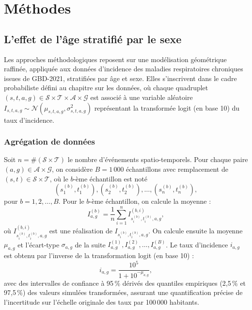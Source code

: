 \chapter{Méthodes}
\label{chap:methods}

\section{L'effet de l'âge stratifié par le sexe}

Les approches méthodologiques reposent sur une modélisation géométrique raffinée, appliquée aux données d'incidence des maladies respiratoires chroniques issues de GBD-2021, stratifiées par âge et sexe. Elles s'inscrivent dans le cadre probabiliste défini au chapitre sur les données, où chaque quadruplet $(s,t,a,g) \in \mathcal{S} \times \mathcal{T} \times \mathcal{A} \times \mathcal{G}$ est associé à une variable aléatoire $I_{s,t,a,g} \sim \mathcal{N}(\mu_{s,t,a,g}, \sigma_{s,t,a,g}^2)$ représentant la transformée logit (en base 10) du taux d'incidence.

\subsection{Agrégation de données}

Soit $n = \# (\mathcal{S} \times \mathcal{T})$ le nombre d'événements spatio-temporels. Pour chaque paire $(a,g) \in \mathcal{A} \times \mathcal{G}$, on considère $B = 1\,000$ échantillons avec remplacement de $(s,t) \in \mathcal{S} \times \mathcal{T}$, où le $b$-ème échantillon est noté
\begin{equation}
(s_1^{(b)}, t_1^{(b)}), (s_2^{(b)}, t_2^{(b)}), \dots, (s_n^{(b)}, t_n^{(b)}),
\end{equation}
pour $b = 1, 2, \dots, B$. Pour le $b$-ème échantillon, on calcule la moyenne :
\begin{equation}
I_{a,g}^{(b)} = \frac{1}{n} \sum_{i=1}^n I_{s_i^{(b)}, t_i^{(b)}, a, g}^{(b,i)},
\end{equation}
où $I_{s_i^{(b)}, t_i^{(b)}, a, g}^{(b,i)}$ est une réalisation de $I_{s_i^{(b)}, t_i^{(b)}, a, g}$. On calcule ensuite la moyenne $\mu_{a,g}$ et l'écart-type $\sigma_{a,g}$ de la suite $I_{a,g}^{(1)}, I_{a,g}^{(2)}, \dots, I_{a,g}^{(B)}$. Le taux d'incidence $i_{a,g}$ est obtenu par l'inverse de la transformation logit (en base 10) :
\begin{equation}
i_{a,g} = \frac{10^5}{1 + 10^{-\mu_{a,g}}},
\end{equation}
avec des intervalles de confiance à 95\,\% dérivés des quantiles empiriques (2,5\,\% et 97,5\,\%) des valeurs simulées transformées, assurant une quantification précise de l'incertitude sur l'échelle originale des taux par 100\,000 habitants.

